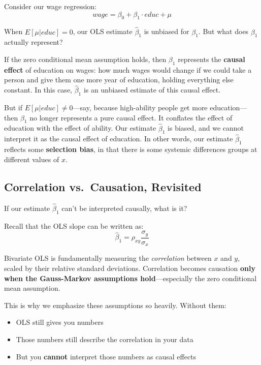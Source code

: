 \documentclass[
  letterpaper,
  DIV=11,
  numbers=noendperiod]{scrreprt}
\providecommand{\tightlist}{%
  \setlength{\itemsep}{0pt}\setlength{\parskip}{0pt}}
\begin{document}
Consider our wage regression:
\[wage = \beta_0 + \beta_1 \cdot educ + \mu\]

When \(E[\mu | educ] = 0\), our OLS estimate \(\hat{\beta}_1\) is
unbiased for \(\beta_1\). But what does \(\beta_1\) actually represent?

If the zero conditional mean assumption holds, then \(\beta_1\)
represents the \textbf{causal effect} of education on wages: how much
wages would change if we could take a person and give them one more year
of education, holding everything else constant. In this case,
\(\hat{\beta}_1\) is an unbiased estimate of this causal effect.

But if \(E[\mu | educ] \neq 0\)---say, because high-ability people get
more education---then \(\beta_1\) no longer represents a pure causal
effect. It conflates the effect of education with the effect of ability.
Our estimate \(\hat{\beta}_1\) is biased, and we cannot interpret it as
the causal effect of education. In other words, our estimate
\(\hat{\beta}_1\) reflects some \textbf{selection bias}, in that there
is some systemic differences groups at different values of \(x\).

\subsection{Correlation vs.~Causation,
Revisited}\label{correlation-vs.-causation-revisited}

If our estimate \(\hat{\beta}_1\) can't be interpreted causally, what is
it?

Recall that the OLS slope can be written as:
\[\hat{\beta}_1 = \rho_{xy} \frac{\sigma_y}{\sigma_x}\]

Bivariate OLS is fundamentally measuring the \emph{correlation} between
\(x\) and \(y\), scaled by their relative standard deviations.
Correlation becomes causation \textbf{only when the Gauss-Markov
assumptions hold}---especially the zero conditional mean assumption.

This is why we emphasize these assumptions so heavily. Without them:

\begin{itemize}
\tightlist
\item
  OLS still gives you numbers
\item
  Those numbers still describe the correlation in your data
\item
  But you \textbf{cannot} interpret those numbers as causal effects
\end{itemize}
\end{document}
